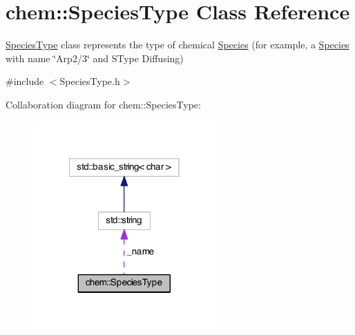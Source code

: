 \hypertarget{classchem_1_1SpeciesType}{\section{chem\-:\-:Species\-Type Class Reference}
\label{classchem_1_1SpeciesType}
}


\hyperlink{classchem_1_1SpeciesType}{Species\-Type} class represents the type of chemical \hyperlink{classchem_1_1Species}{Species} (for example, a \hyperlink{classchem_1_1Species}{Species} with name \char`\"{}\-Arp2/3\char`\"{} and S\-Type Diffusing)  




{\ttfamily \#include $<$Species\-Type.\-h$>$}



Collaboration diagram for chem\-:\-:Species\-Type\-:\nopagebreak
\begin{figure}[H]
\begin{center}
\leavevmode
\includegraphics[width=198pt]{classchem_1_1SpeciesType__coll__graph}
\end{center}
\end{figure}
